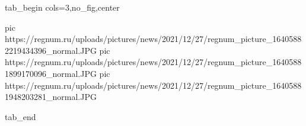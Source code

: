  
 
 
 
 


\ifcmt
  tab_begin cols=3,no_fig,center

     pic https://regnum.ru/uploads/pictures/news/2021/12/27/regnum_picture_16405882219434396_normal.JPG
		 pic https://regnum.ru/uploads/pictures/news/2021/12/27/regnum_picture_16405881899170096_normal.JPG
		 pic https://regnum.ru/uploads/pictures/news/2021/12/27/regnum_picture_16405881948203281_normal.JPG

  tab_end
\fi
